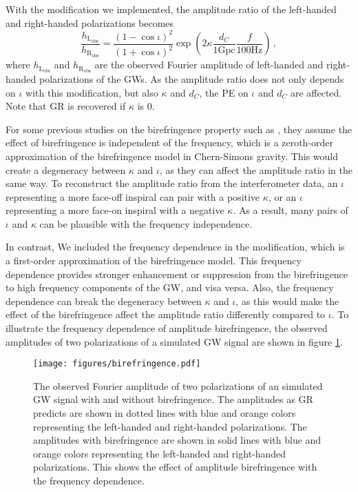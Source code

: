 \documentclass[aps,prd,twocolumn,superscriptaddress,preprintnumbers,floatfix,nofootinbib]{revtex4-2}
\begin{document}
With the modification we implemented, the amplitude ratio of the left-handed and right-handed polarizations becomes 
\begin{equation}
    \frac{h_\mathrm{L_{obs}}}{h_\mathrm{R_{obs}}}=\frac{\left(1-\cos\iota\right)^2}{\left(1+\cos\iota\right)^2}\exp\left({2\kappa\frac{d_C}{1\mathrm{Gpc}}\frac{f}{100\mathrm{Hz}}}\right)\,,
\end{equation}
where $h_\mathrm{L_{obs}}$ and $h_\mathrm{R_{obs}}$ are the observed Fourier amplitude of left-handed and right-handed polarizations of the GWs.
As the amplitude ratio does not only depends on $\iota$ with this modification, but also $\kappa$ and $d_C$, the PE on $\iota$ and $d_C$ are affected. Note that GR is recovered if $\kappa$ is $0$.

For some previous studies on the birefringence property such as \citet{Okounkova_2022}, they assume the effect of birefringence is independent of the frequency, which is a zeroth-order approximation of the birefringence model in Chern-Simons gravity.
This would create a degeneracy between $\kappa$ and $\iota$, as they can affect the amplitude ratio in the same way.
To reconstruct the amplitude ratio from the interferometer data, an $\iota$ representing a more face-off inspiral can pair with a positive $\kappa$, or an $\iota$ representing a more face-on inspiral with a negative $\kappa$.
As a result, many pairs of $\iota$ and $\kappa$ can be plausible with the frequency independence.

In contrast, We included the frequency dependence in the modification, which is a first-order approximation of the birefringence model.
This frequency dependence provides stronger enhancement or suppression from the birefringence to high frequency components of the GW, and visa versa.
Also, the frequency dependence can break the degeneracy between $\kappa$ and $\iota$, as this would make the effect of the birefringence affect the amplitude ratio differently compared to $\iota$.
To illustrate the frequency dependence of amplitude birefringence, the observed amplitudes of two polarizations of a simulated GW signal are shown in figure \ref{fig:birefringence}.

\begin{figure}[h]
    \texttt{[image: figures/birefringence.pdf]}
    \caption{
        The observed Fourier amplitude of two polarizations of an simulated GW signal with and without birefringence.
        The amplitudes as GR predicts are shown in dotted lines with blue and orange colors representing the left-handed and right-handed polarizations.
        The amplitudes with birefringence are shown in solid lines with blue and orange colors representing the left-handed and right-handed polarizations.
        This shows the effect of amplitude birefringence with the frequency dependence.
    }
    \label{fig:birefringence}
\end{figure}
\end{document}
